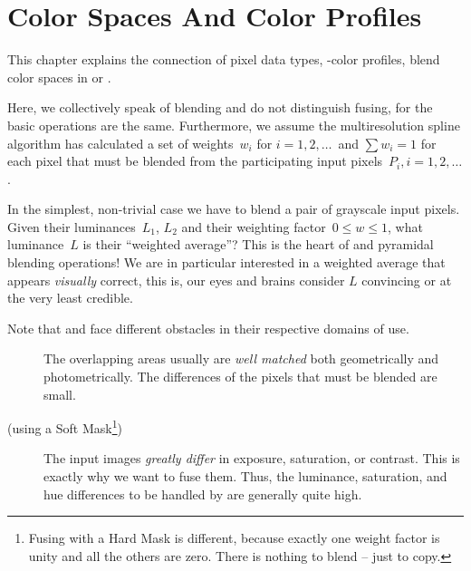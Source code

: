 

\chapter[Color Spaces\commonpart]{\label{sec:color-spaces}%
  Color Spaces And Color Profiles\commonpart}

%
%
This chapter explains the connection of pixel data types,
-color profiles, blend color spaces in
 or .

%
%
%
%
Here, we collectively speak of blending and do not distinguish fusing, for the basic operations
are the same.  Furthermore, we assume the multiresolution spline algorithm has calculated a set
of weights~$w_i$ for $i = 1, 2, \dots$~and $\sum w_i = 1$ for each pixel that must be blended
from the participating input pixels~$P_i, i = 1, 2, \dots$.

%
%
In the simplest, non-trivial case we have to blend a pair of grayscale input pixels.  Given
their luminances~$L_1$, $L_2$ and their weighting factor~$0 \leq w \leq 1$, what luminance~$L$
is their ``weighted average''?  This is the heart of  and
 pyramidal blending operations!  We are in particular interested in a
weighted average that appears \emph{visually} correct, this is, our eyes and brains consider $L$
convincing or at the very least credible.

\begin{geeknote}
  \noindent Note that  and  face different obstacles in
  their respective domains of use.

  \begin{description}
  \item[]\itemend
    The overlapping areas usually are \emph{well matched} both geometrically and
    photometrically.  The differences of the pixels that must be blended are small.

  \item[ (using a Soft Mask\footnote{Fusing with a Hard Mask is different,
      because exactly one weight factor is unity and all the others are zero.  There is nothing
      to blend -- just to copy.})]\itemend
    The input images \emph{greatly differ} in exposure, saturation, or contrast.  This is
    exactly why we want to fuse them.  Thus, the luminance, saturation, and hue differences to
    be handled by  are generally quite high.
  \end{description}
\end{geeknote}

